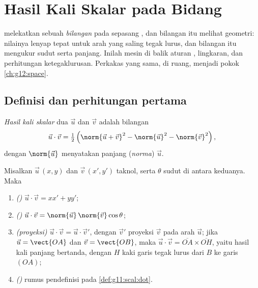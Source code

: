 \chapter{Hasil Kali Skalar pada Bidang}\label{ch:g11:scal}

 melekatkan sebuah \emph{bilangan} pada sepasang , dan
bilangan itu melihat geometri: nilainya lenyap tepat untuk arah yang saling
tegak lurus, dan bilangan itu mengukur sudut serta panjang. Inilah mesin di
balik aturan ,  lingkaran, dan perhitungan ketegaklurusan.
Perkakas yang sama, di ruang, menjadi pokok \cref{ch:g12:space}.

\section{Definisi dan perhitungan pertama}

\begin{definition}\label{def:g11:scal:dot}
\emph{Hasil kali skalar} dua  $\vec u$
dan $\vec v$ adalah bilangan
\[
\vec u \cdot \vec v
= \tfrac12\left(\norm{\vec u + \vec v}^2 - \norm{\vec u}^2
- \norm{\vec v}^2\right),
\]
dengan $\norm{\vec u}$ menyatakan panjang (\emph{norma}) $\vec u$.
\end{definition}

\begin{theorem}\label{thm:g11:scal:faces}
Misalkan $\vec u\,(x, y)$ dan $\vec v\,(x', y')$  taknol, serta
$\theta$ sudut di antara keduanya. Maka
\begin{enumerate}
  \item \emph{()} $\vec u \cdot \vec v = xx' + yy'$;
  \item \emph{()} $\vec u \cdot \vec v =
        \norm{\vec u}\,\norm{\vec v}\cos\theta$;
  \item \emph{(proyeksi)} $\vec u \cdot \vec v = \vec u \cdot \vec v'$,
        dengan $\vec v'$ proyeksi  $\vec v$ pada
        arah $\vec u$; jika $\vec u = \vect{OA}$ dan
        $\vec v = \vect{OB}$, maka
        $\vec u \cdot \vec v = \overline{OA} \times \overline{OH}$, yaitu
        hasil kali panjang bertanda, dengan $H$ kaki
        garis tegak lurus dari $B$ ke garis $(OA)$;
  \item \emph{()} rumus pendefinisi pada \cref{def:g11:scal:dot}.
\end{enumerate}
\end{theorem}

